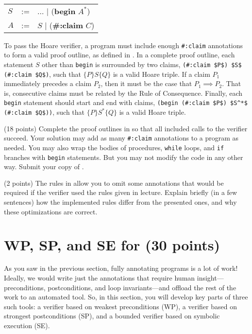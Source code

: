 \documentclass{handout}
\begin{document}
{\tt\small
\begin{tabular}{lcl}
$S$ &:=&  $\ldots$ $|$ (\textbf{begin} $A^*$)  \\
$A$ &:=&  $S$ $|$ (\textbf{\#:claim} $C$)\\
\end{tabular}}

To pass the Hoare verifier, a program must include enough \lstinline{#:claim}
annotations to form a valid proof outline, as defined in . In a
complete proof outline, each statement $S$ other than \lstinline{begin} is
surrounded by two claims, \lstinline{(#:claim $P$) $S$ (#:claim $Q$)}, such that
$\{P\}S\{Q\}$ is a valid Hoare triple. If a claim $P_1$ immediately precedes a
claim $P_2$, then it must be the case that $P_1 \implies P_2$. That is,
consecutive claims must be related by the Rule of Consequence. Finally, each
\lstinline{begin} statement should start and end with claims,
\lstinline{(begin (#:claim $P$) $S^*$ (#:claim $Q$))}, such that
$\{P\}S^*\{Q\}$ is a valid Hoare triple.


\begin{questions}
\item (18 points) \label{prob:hoare-proofs} Complete the proof outlines in
 so that all included calls to the verifier succeed. Your
solution may add as many \lstinline{#:claim} annotations to a program as needed.
You may also wrap the bodies of procedures, \lstinline{while} loops, and
\lstinline{if} branches with \lstinline{begin} statements. But you may not
modify the code in any other way. Submit your copy of .



\item (2 points) \label{prob:hoare-study} The rules in 
allow you to omit some annotations that would be required if the verifier used
the rules given in lecture. Explain briefly (in a few sentences) how the
implemented rules differ from the presented ones, and why these optimizations
are correct.



\end{questions}

\section{WP, SP, and SE for \imp (30 points)}\label{sec:imp:wp/sp/se}

As you saw in the previous section, fully annotating programs is a lot of work!
Ideally, we would write just the annotations that require human
insight---preconditions, postconditions, and loop invariants---and offload the
rest of the work to an automated tool. So, in this section, you will develop key
parts of three such tools: a verifier based on weakest preconditions (WP), a
verifier based on strongest postconditions (SP), and a bounded verifier based on
symbolic execution (SE).
\end{document}
